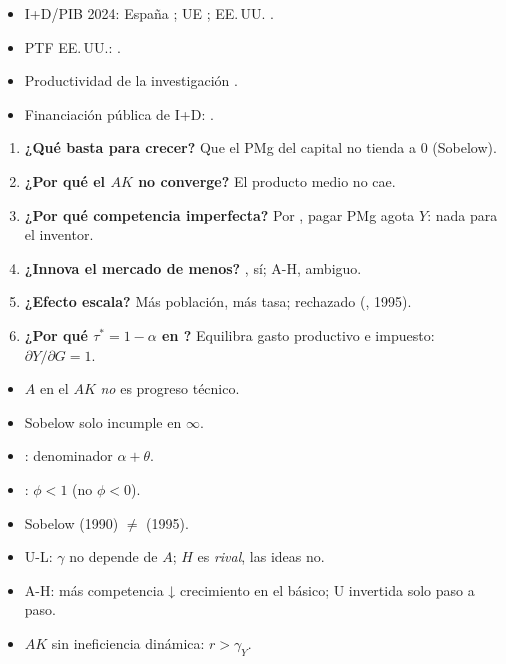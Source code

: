 \documentclass{article}
\begin{document}
\begin{columnas}
\anexorepaso
{}
\begin{itemize}
\item I+D/PIB 2024: España ; UE ; EE.\,UU. .
\item PTF EE.\,UU.: .
\item Productividad de la investigación .
\item Financiación pública de I+D: .
\end{itemize}
\begin{enumerate}
\item \textbf{¿Qué basta para crecer?} Que el PMg del capital no tienda a 0 (Sobelow).
\item \textbf{¿Por qué el $AK$ no converge?} El producto medio no cae.
\item \textbf{¿Por qué competencia imperfecta?} Por , pagar PMg agota $Y$: nada para el inventor.
\item \textbf{¿Innova el mercado de menos?} , sí; A-H, ambiguo.
\item \textbf{¿Efecto escala?} Más población, más tasa; rechazado (, 1995).
\item \textbf{¿Por qué $\tau^*=1-\alpha$ en ?} Equilibra gasto productivo e impuesto: $\partial Y/\partial G=1$.
\end{enumerate}
\begin{trampa}
\begin{itemize}
\item $A$ en el $AK$ \emph{no} es progreso técnico.
\item Sobelow solo incumple  en $\infty$.
\item {}: denominador $\alpha+\theta$.
\item {}: $\phi<1$ (no $\phi<0$).
\item Sobelow (1990) $\neq$  (1995).
\item U-L: $\gamma$ no depende de $A$; $H$ es \emph{rival}, las ideas no.
\item A-H: más competencia ↓ crecimiento en el básico; U invertida solo paso a paso.
\item $AK$ sin ineficiencia dinámica: $r>\gamma_Y$.
\end{itemize}
\end{trampa}

\end{columnas}
\end{document}
